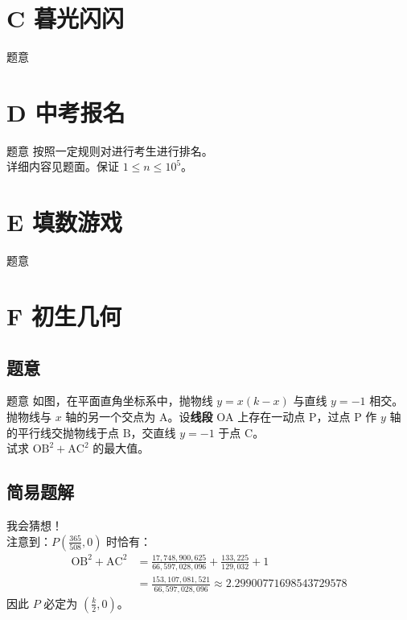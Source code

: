 \documentclass[11pt, fontset = fandol]{ctexbeamer}
\begin{document}
\section{C 暮光闪闪}
\begin{frame}
  \begin{block}{题意}
  \end{block}
\end{frame}

\section{D 中考报名}
\begin{frame}
  \begin{block}{题意}
    按照一定规则对进行考生进行排名。\\
    详细内容见题面。保证 $1 \le n \le {10} ^5$。
  \end{block}
\end{frame}

\section{E 填数游戏}
\begin{frame}
  \begin{block}{题意}
  \end{block}
\end{frame}

\section{F 初生几何}
\subsection{题意}
\begin{frame}
  \begin{block}{题意}
    如图，在平面直角坐标系中，抛物线 $ y = x\left(k - x\right) $ 与直线 $ y = -1 $ 相交。抛物线与 $ x $ 轴的另一个交点为 $\mathrm{A}$。设\textbf{线段} $\mathrm{OA}$ 上存在一动点 $\mathrm{P}$，过点 $\mathrm{P}$ 作 $y$ 轴的平行线交抛物线于点 $\mathrm{B}$，交直线 $y = -1$ 于点 $\mathrm{C}$。\\
    试求 $\mathrm{OB}^2 + \mathrm{AC}^2$ 的最大值。
  \end{block}
\end{frame}

\subsection{简易题解}
\begin{frame}
  \pause
  我会猜想！\\
  \pause
  注意到：$P\left(\frac{365}{508}, 0\right)$ 时恰有：
  $$
  \begin{aligned}
    \mathrm{OB}^2 + \mathrm{AC}^2 &= \frac{17,748,900,625}{66,597,028,096} + \frac{133,225}{129,032} + 1\\
    &= \frac{153,107,081,521}{66,597,028,096} \approx 2.29900771698543729578
  \end{aligned}
  $$
  因此 $P$ 必定为 $(\frac{k}{2}, 0)$。\\

\end{frame}
\end{document}
